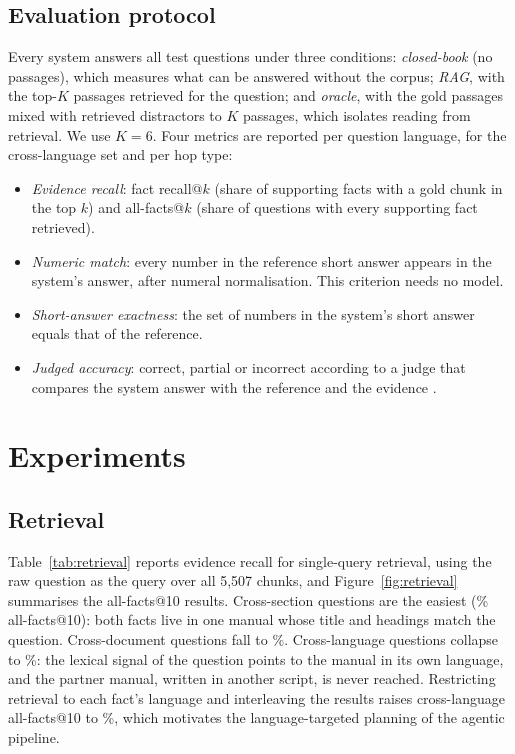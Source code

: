 \documentclass[preprint,12pt]{elsarticle}
\begin{document}
\subsection{Evaluation protocol}
\label{sec:protocol}
Every system answers all \NTest{} test questions under three conditions: \emph{closed-book} (no passages), which measures what can be answered without the corpus; \emph{RAG}, with the top-$K$ passages retrieved for the question; and \emph{oracle}, with the gold passages mixed with retrieved distractors to $K$ passages, which isolates reading from retrieval. We use $K=6$. Four metrics are reported per question language, for the cross-language set and per hop type:
\begin{itemize}
\item \emph{Evidence recall}: fact recall@$k$ (share of supporting facts with a gold chunk in the top $k$) and all-facts@$k$ (share of questions with every supporting fact retrieved).
\item \emph{Numeric match}: every number in the reference short answer appears in the system's answer, after numeral normalisation. This criterion needs no model.
\item \emph{Short-answer exactness}: the set of numbers in the system's short answer equals that of the reference.
\item \emph{Judged accuracy}: correct, partial or incorrect according to a judge that compares the system answer with the reference and the evidence \cite{zheng2023judge}.
\end{itemize}

\section{Experiments}
\label{sec:experiments}

\subsection{Retrieval}
Table~\ref{tab:retrieval} reports evidence recall for single-query retrieval, using the raw question as the query over all 5,507 chunks, and Figure~\ref{fig:retrieval} summarises the all-facts@10 results. Cross-section questions are the easiest (\RCSTen\% all-facts@10): both facts live in one manual whose title and headings match the question. Cross-document questions fall to \RCDTen\%. Cross-language questions collapse to \RXLTen\%: the lexical signal of the question points to the manual in its own language, and the partner manual, written in another script, is never reached. Restricting retrieval to each fact's language and interleaving the results raises cross-language all-facts@10 to \RXLLFTen\%, which motivates the language-targeted planning of the agentic pipeline.
\end{document}
